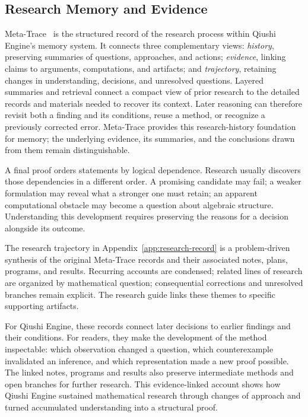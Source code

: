 \subsection{Research Memory and Evidence}

Meta-Trace~\cite{yang2026optical} is the structured record of the research process within
Qiushi Engine's memory system. It connects three complementary views:
\emph{history}, preserving summaries of questions, approaches, and actions;
\emph{evidence}, linking claims to arguments, computations, and artifacts;
and \emph{trajectory}, retaining changes in understanding, decisions, and
unresolved questions. Layered summaries and retrieval connect a compact
view of prior research to the detailed records and materials needed to
recover its context. Later reasoning can therefore revisit both a finding
and its conditions, reuse a method, or recognize a previously corrected
error. Meta-Trace provides this research-history foundation for memory;
the underlying evidence, its summaries, and the conclusions drawn from
them remain distinguishable.

A final proof orders statements by logical dependence. Research usually
discovers those dependencies in a different order. A promising candidate
may fail; a weaker formulation may reveal what a stronger one must retain;
an apparent computational obstacle may become a question about algebraic
structure. Understanding this development requires preserving the reasons
for a decision alongside its outcome.

The research trajectory in Appendix~\ref{app:research-record} is a
problem-driven synthesis of the original Meta-Trace records and their
associated notes, plans, programs, and results. Recurring accounts are
condensed; related lines of research are organized by mathematical question;
consequential corrections and unresolved branches remain explicit.
The research guide links these themes to specific supporting artifacts.

For Qiushi Engine, these records connect later decisions to earlier findings
and their conditions. For readers, they make the development of the method
inspectable: which observation changed a question, which counterexample
invalidated an inference, and which representation made a new proof possible.
The linked notes, programs and results also preserve intermediate methods
and open branches for further research. This evidence-linked account shows
how Qiushi Engine sustained mathematical research through changes of approach
and turned accumulated understanding into a structural proof.

